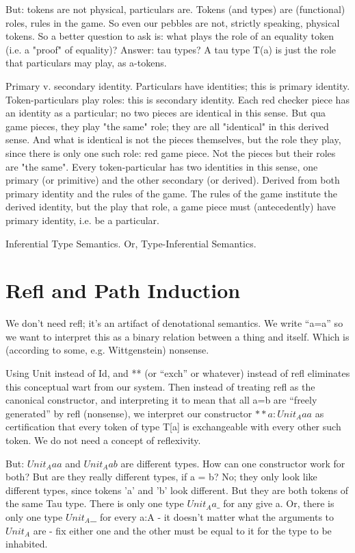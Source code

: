 \documentclass{article}
\begin{document}
But: tokens are not physical, particulars are.  Tokens (and types) are
(functional) roles, rules in the game.  So even our pebbles are not,
strictly speaking, physical tokens.  So a better question to ask is:
what plays the role of an equality token (i.e. a "proof" of equality)?
Answer: tau types?  A tau type T(a) is just the role that particulars
may play, as a-tokens.

Primary v. secondary identity.  Particulars have identities; this is
primary identity.  Token-particulars play roles: this is secondary
identity.  Each red checker piece has an identity as a particular; no
two pieces are identical in this sense.  But qua game pieces, they
play "the same" role; they are all "identical" in this derived sense.
And what is identical is not the pieces themselves, but the role they
play, since there is only one such role: red game piece.  Not the
pieces but their roles are "the same".  Every token-particular has two
identities in this sense, one primary (or primitive) and the other
secondary (or derived).  Derived from both primary identity and the
rules of the game.  The rules of the game institute the derived
identity, but the play that role, a game piece must (antecedently)
have primary identity, i.e. be a particular.

Inferential Type Semantics.  Or, Type-Inferential Semantics.

\section{Refl and Path Induction}

We don't need refl; it's an artifact of denotational semantics.  We
write ``a=a'' so we want to interpret this as a binary relation
between a thing and itself.  Which is (according to some,
e.g. Wittgenstein) nonsense.

Using Unit instead of Id, and ** (or ``exch'' or whatever) instead of
refl eliminates this conceptual wart from our system.  Then instead of
treating refl as the canonical constructor, and interpreting it to
mean that all a=b are ``freely generated'' by refl (nonsense), we
interpret our constructor \(**a: Unit_A a a\) as certification that
every token of type T[a] is exchangeable with every other such token.
We do not need a concept of reflexivity.

But: \(Unit_A a a\) and \(Unit_A a b\) are different types.  How can
one constructor work for both?  But are they really different types,
if a = b?  No; they only look like different types, since tokens 'a'
and 'b' look different.  But they are both tokens of the same Tau
type.  There is only one type \(Unit_A a \_\) for any give a.  Or,
there is only one type \(Unit_A \_ \_\) for every a:A - it doesn't
matter what the arguments to \(Unit_A\) are - fix either one and the
other must be equal to it for the type to be inhabited.
\end{document}
